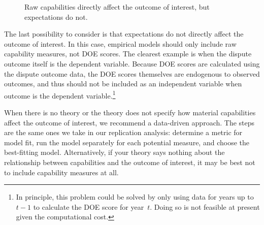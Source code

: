\begin{figure}[htp]
  \centering
  
  \caption{
    Raw capabilities directly affect the outcome of interest, but expectations do not.
  }
  \label{fig:dag-cap1-doe0}
\end{figure}

The last possibility to consider is that expectations do not directly affect the outcome of interest.
In this case, empirical models should only include raw capability measures, not DOE scores.
The clearest example is when the dispute outcome itself is the dependent variable.
Because DOE scores are calculated using the dispute outcome data, the DOE scores themselves are endogenous to observed outcomes, and thus should not be included as an independent variable when outcome is the dependent variable.\footnote{%
  In principle, this problem could be solved by only using data for years up to $t-1$ to calculate the DOE score for year~$t$.
  Doing so is not feasible at present given the computational cost.
}

When there is no theory or the theory does not specify how material capabilities affect the outcome of interest, we recommend a data-driven approach.
The steps are the same ones we take in our replication analysis: determine a metric for model fit, run the model separately for each potential measure, and choose the best-fitting model.
Alternatively, if your theory says nothing about the relationship between capabilities and the outcome of interest, it may be best not to include capability measures at all.

